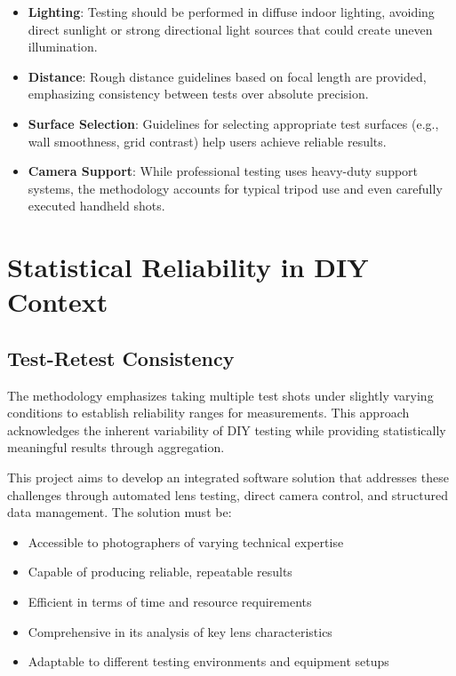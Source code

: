 \begin{itemize}
    \item \textbf{Lighting}: Testing should be performed in diffuse indoor lighting, avoiding direct sunlight or strong directional light sources that could create uneven illumination.
    \item \textbf{Distance}: Rough distance guidelines based on focal length are provided, emphasizing consistency between tests over absolute precision.
    \item \textbf{Surface Selection}: Guidelines for selecting appropriate test surfaces (e.g., wall smoothness, grid contrast) help users achieve reliable results.
    \item \textbf{Camera Support}: While professional testing uses heavy-duty support systems, the methodology accounts for typical tripod use and even carefully executed handheld shots.
\end{itemize}

\section{Statistical Reliability in DIY Context}

\subsection{Test-Retest Consistency}
The methodology emphasizes taking multiple test shots under slightly varying conditions to establish reliability ranges for measurements. This approach acknowledges the inherent variability of DIY testing while providing statistically meaningful results through aggregation.

This project aims to develop an integrated software solution that addresses these challenges through automated lens testing, direct camera control, and structured data management. The solution must be:

\begin{itemize}
    \item Accessible to photographers of varying technical expertise
    \item Capable of producing reliable, repeatable results
    \item Efficient in terms of time and resource requirements
    \item Comprehensive in its analysis of key lens characteristics
    \item Adaptable to different testing environments and equipment setups
\end{itemize}


